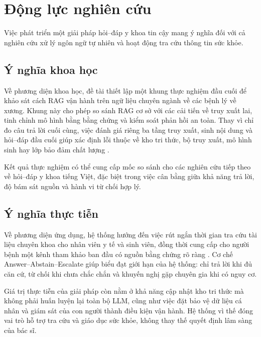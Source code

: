 \section{Động lực nghiên cứu}

Việc phát triển một giải pháp hỏi--đáp y khoa tin cậy mang ý nghĩa đối với cả nghiên cứu xử lý ngôn ngữ tự nhiên và hoạt động tra cứu thông tin sức khỏe.

\subsection{Ý nghĩa khoa học}

Về phương diện khoa học, đề tài thiết lập một khung thực nghiệm đầu cuối để khảo sát cách RAG vận hành trên ngữ liệu chuyên ngành về các bệnh lý về xương. Khung này cho phép so sánh RAG cơ sở với các cải tiến về truy xuất lai, tinh chỉnh mô hình bằng bằng chứng và kiểm soát phản hồi an toàn. Thay vì chỉ đo câu trả lời cuối cùng, việc đánh giá riêng ba tầng truy xuất, sinh nội dung và hỏi--đáp đầu cuối giúp xác định lỗi thuộc về kho tri thức, bộ truy xuất, mô hình sinh hay lớp bảo đảm chất lượng \cite{xiong2024mirage, medrag2024}.

Kết quả thực nghiệm có thể cung cấp mốc so sánh cho các nghiên cứu tiếp theo về hỏi--đáp y khoa tiếng Việt, đặc biệt trong việc cân bằng giữa khả năng trả lời, độ bám sát nguồn và hành vi từ chối hợp lý.

\subsection{Ý nghĩa thực tiễn}

Về phương diện ứng dụng, hệ thống hướng đến việc rút ngắn thời gian tra cứu tài liệu chuyên khoa cho nhân viên y tế và sinh viên, đồng thời cung cấp cho người bệnh một kênh tham khảo ban đầu có nguồn bằng chứng rõ ràng \cite{ortho_rag_13}. Cơ chế Answer--Abstain--Escalate giúp biểu đạt giới hạn của hệ thống: chỉ trả lời khi đủ căn cứ, từ chối khi chưa chắc chắn và khuyến nghị gặp chuyên gia khi có nguy cơ.

Giá trị thực tiễn của giải pháp còn nằm ở khả năng cập nhật kho tri thức mà không phải huấn luyện lại toàn bộ LLM, cũng như việc đặt bảo vệ dữ liệu cá nhân và giám sát của con người thành điều kiện vận hành. Hệ thống vì thế đóng vai trò hỗ trợ tra cứu và giáo dục sức khỏe, không thay thế quyết định lâm sàng của bác sĩ.
